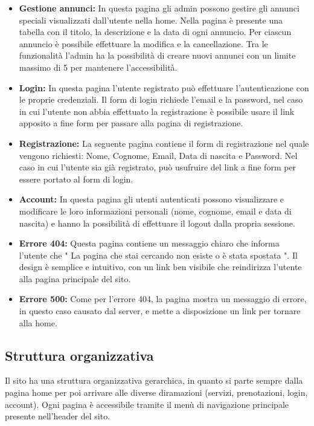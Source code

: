 \documentclass{article}
\begin{document}
\begin{itemize}
    \item \textbf{Gestione annunci:} In questa pagina gli admin possono gestire gli annunci speciali visualizzati dall'utente nella home. Nella pagina è presente una tabella con il titolo, la descrizione e la data di ogni annuncio. Per ciascun annuncio è possibile effettuare la modifica e la cancellazione. Tra le funzionalità l'admin ha la possibilità di creare nuovi annunci con un limite massimo di 5 per mantenere l'accessibilità. 

    \item \textbf{Login:} In questa pagina l'utente registrato può effettuare l'autenticazione con le proprie credenziali. Il form di login richiede l'email e la password, nel caso in cui l'utente non abbia effettuato la registrazione è possibile usare il link apposito a fine form per passare alla pagina di registrazione.

    \item \textbf{Registrazione:} La seguente pagina contiene il form di registrazione nel quale vengono richiesti: Nome, Cognome, Email, Data di nascita e Password. Nel caso in cui l'utente sia già registrato, può usufruire del link a fine form per essere portato al form di login. 
    
    \item \textbf{Account:} In questa pagina gli utenti autenticati possono visualizzare e modificare le loro informazioni personali (nome, cognome, email e data di nascita) e hanno la possibilità di effettuare il logout dalla propria sessione. 
    
    \item \textbf{Errore 404:} Questa pagina contiene un messaggio chiaro che informa l'utente che " La pagina che stai cercando non esiste o è stata spostata ". Il design è semplice e intuitivo, con un link ben visibile che reindirizza l'utente alla pagina principale del sito.

    \item \textbf{Errore 500:} Come per l'errore 404, la pagina mostra un messaggio di errore, in questo caso causato dal server, e mette a disposizione un link per tornare alla home.
\end{itemize}

\subsection{Struttura organizzativa}

Il sito ha una struttura organizzativa gerarchica, in quanto si parte sempre dalla pagina home 
per poi arrivare alle diverse diramazioni (servizi, prenotazioni, login, account). 
Ogni pagina è accessibile tramite il menù di navigazione principale presente nell'header del sito.
\end{document}
